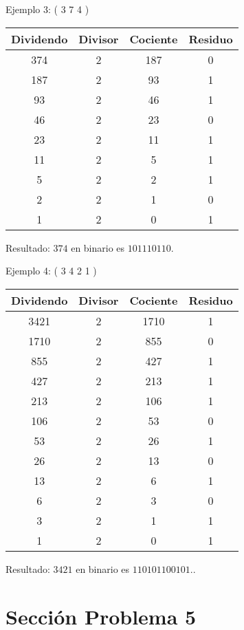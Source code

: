 \documentclass{IEEEcsmag}
\begin{document}
Ejemplo 3: ( 3 7 4 )  \newline
\newline \begin{tabular}{|c|c|c|c|}
  \hline
  Dividendo & Divisor & Cociente & Residuo \\
  \hline
  374 & 2 & 187 & 0 \\
  187 & 2 & 93 & 1 \\
  93 & 2 & 46 & 1 \\
  46 & 2 & 23 & 0 \\
  23 & 2 & 11 & 1 \\
  11 & 2 & 5 & 1 \\
  5 & 2 & 2 & 1 \\
  2 & 2 & 1 & 0 \\
  1 & 2 & 0 & 1 \\
  \hline
\end{tabular}
\newline

Resultado: \(374\) en binario es \(101110110\).
\newline


Ejemplo 4: ( 3 4 2 1 ) \newline 
\newline \begin{tabular}{|c|c|c|c|}
  \hline
  Dividendo & Divisor & Cociente & Residuo \\
  \hline
  3421 & 2 & 1710 & 1 \\
  1710 & 2 & 855 & 0 \\
  855 & 2 & 427 & 1 \\
  427 & 2 & 213 & 1 \\
  213 & 2 & 106 & 1 \\
  106 & 2 & 53 & 0 \\
  53 & 2 & 26 & 1 \\
  26 & 2 & 13 & 0 \\
  13 & 2 & 6 & 1 \\
  6 & 2 & 3 & 0 \\
  3 & 2 & 1 & 1 \\
  1 & 2 & 0 & 1 \\
  \hline
\end{tabular}
\newline

Resultado: \(3421\) en binario es \( 110101100101.\).
\newpage





\section{Sección Problema 5}
\end{document}
